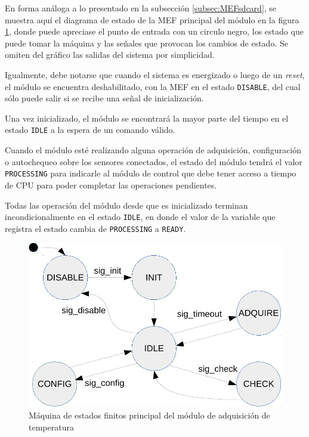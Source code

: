 En forma análoga a lo presentado en la subsección \ref{subsec:MEFsdcard}, se muestra aquí el diagrama de estado de la MEF principal del módulo en la figura \ref{fig:mef_adquisicion}, donde puede apreciase el punto de entrada con un circulo negro, los estado que puede tomar la máquina y las señales que provocan los cambios de estado. Se omiten del gráfico las salidas del sistema por simplicidad.

Igualmente, debe notarse que cuando el sistema es energizado o luego de un \textit{reset}, el módulo se encuentra deshabilitado, con la MEF en el estado \texttt{DISABLE}, del cual sólo puede salir si se recibe una señal de inicialización.

Una vez inicializado, el módulo se encontrará la mayor parte del tiempo en el estado \texttt{IDLE} a la espera de un comando válido.

Cuando el módulo esté realizando alguna operación de adquisición, configuración o autochequeo sobre los sensores conectados, el estado del módulo tendrá el valor \texttt{PROCESSING} para indicarle al módulo de control que debe tener acceso a tiempo de CPU para poder completar las operaciones pendientes.

Todas las operación del módulo desde que es inicializado terminan incondicionalmente en el estado \texttt{IDLE}, en donde el valor de la variable que registra el estado cambia de \texttt{PROCESSING} a \texttt{READY}.

\begin{figure}[htpb]
	\centering
	\includegraphics[width=\textwidth]{./Figures/MEF_adquisicion.pdf}
	\caption[MEF principal del módulo de adquisición de temperatura]{Máquina de estados finitos principal del módulo de adquisición de temperatura}
	\label{fig:mef_adquisicion}
\end{figure}

